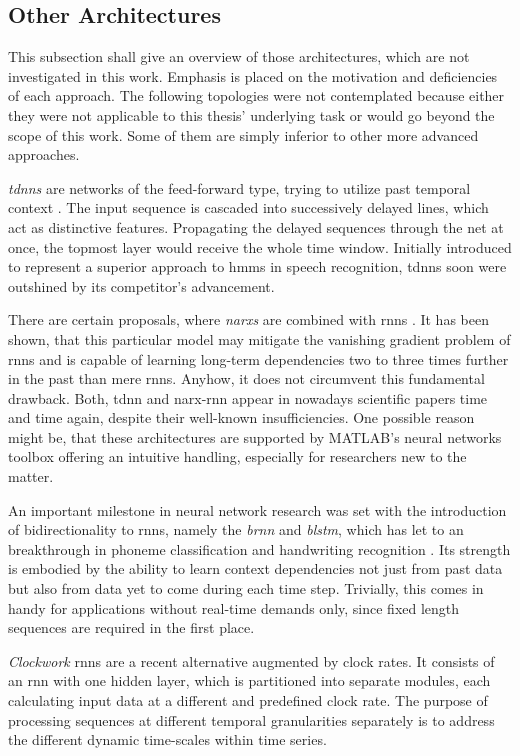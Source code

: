\subsection{Other Architectures}
\label{ssec:other_archs}
This subsection shall give an overview of those architectures, which are not investigated in this work.
Emphasis is placed on the motivation and deficiencies of each approach.
The following topologies were not contemplated because either they were not applicable to this thesis' underlying task or would go beyond the scope of this work.
Some of them are simply inferior to other more advanced approaches.

\textit{\glspl{tdnn}} are networks of the feed-forward type, trying to utilize past temporal context \cite{LaWa1990}.
The input sequence is cascaded into successively delayed lines, which act as distinctive features.
Propagating the delayed sequences through the net at once, the topmost layer would receive the whole time window.
Initially introduced to represent a superior approach to \glspl{hmm} in speech recognition, \glspl{tdnn} soon were outshined by its competitor's advancement.

There are certain proposals, where \textit{\glspl{narx}} are combined with \glspl{rnn} \cite{LiBi1996}.
It has been shown, that this particular model may mitigate the vanishing gradient problem of \glspl{rnn} and is capable of learning long-term dependencies two to three times further in the past than mere \glspl{rnn}.
Anyhow, it does not circumvent this fundamental drawback.
Both, \gls{tdnn} and \gls{narx}-\gls{rnn} appear in nowadays scientific papers time and time again, despite their well-known insufficiencies.
One possible reason might be, that these architectures are supported by MATLAB's neural networks toolbox offering an intuitive handling, especially for researchers new to the matter.

An important milestone in neural network research was set with the introduction of bidirectionality to \glspl{rnn}, namely the \textit{\gls{brnn}} and \textit{\gls{blstm}}, which has let to an breakthrough in phoneme classification and handwriting recognition \cite{GraSchmi2005, SchuPa1997}.
Its strength is embodied by the ability to learn context dependencies not just from past data but also from data yet to come during each time step.
Trivially, this comes in handy for applications without real-time demands only, since fixed length sequences are required in the first place.

\textit{Clockwork} \glspl{rnn} \cite{KoGre2014} are a recent alternative augmented by clock rates.
It consists of an \gls{rnn} with one hidden layer, which is partitioned into separate modules, each calculating input data at a different and predefined clock rate.
The purpose of processing sequences at different temporal granularities separately is to address the different dynamic time-scales within time series.


